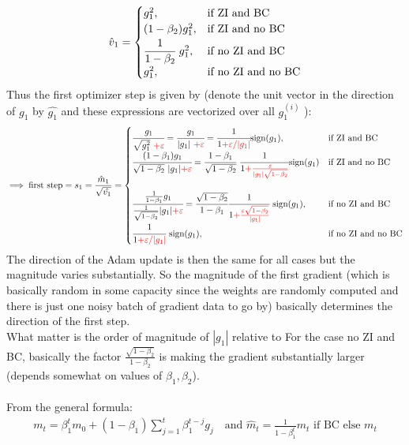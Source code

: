 \documentclass[12pt]{book}
\begin{document}
\[
\hat{v}_1 = \begin{cases}
	g_1^2, \quad &\text{if ZI and BC}\\
	(1-\beta_2)g_1^2, &\text{if ZI and no BC}\\
	\cfrac{1}{1-\beta_2} \ g_1^2, &\text{if no ZI and BC}\\
	g_1^2, &\text{if no ZI and no BC}
\end{cases}
\]
Thus the first optimizer step is given by (denote the unit vector in the direction of $g_1$ by $\hat{g_1}$ and these expressions are vectorized over all $g_1^{(i)}$ ):
\[
\implies \text{first step} = s_1 = \frac{\hat{m}_1}{\sqrt{\hat{v_1}} } = \begin{cases}
	\cfrac{g_1}{\sqrt{g_1^2}  \ \color{red}{+ \varepsilon } } = \cfrac{g_1}{|g_1|  \ \color{red}{+ \varepsilon } } = \cfrac{1}{1 \color{red}{+ \varepsilon / |g_1|}}\text{sign}(g_1), &\text{if ZI and BC}\\
	\cfrac{(1-\beta_1)g_1}{\sqrt{1-\beta_2}\ |g_1| \color{red}{+\varepsilon} } = \cfrac{1-\beta_1}{\sqrt{1-\beta_2} } \ \cfrac{1}{1 \color{red}{+ \frac{\varepsilon }{|g_1|\sqrt{1-\beta_2} }}}\text{sign}(g_1) &\text{if ZI and no BC }\\ 
	\\
	\cfrac{\frac{1}{1-\beta_1}g_1}{\frac{1}{\sqrt{1-\beta_2}} |g_1| \color{red}{+\varepsilon }} =\cfrac{\sqrt{1-\beta_2}}{1-\beta_1} \cfrac{1}{1 \color{red}{+ \frac{\varepsilon \sqrt{1-\beta_2} }{|g_1|}}} \ \text{sign}(g_1), &\text{if no ZI and BC}\\
	\cfrac{1}{1 \color{red}{+ \varepsilon / |g_1|}} \ \text{sign}(g_1), &\text{if no ZI and no BC}\\
\end{cases}
\]
The direction of the Adam update is then the same for all cases but the magnitude varies substantially.
So the magnitude of the first gradient (which is basically random in some capacity since the weights are randomly computed and there is just one noisy batch of gradient data to go by) basically determines the direction of the first step. \\
What matter is the order of magnitude of $|g_1|$ relative to 
For the case no ZI and BC, basically the factor $\frac{\sqrt{1-\beta_2} }{1-\beta_2}$ is making the gradient substantially larger (depends somewhat on values of $\beta_1, \beta_2$). \\
\\
From the general formula:
\begin{align*}
m_t = \beta_1^{t}m_0 + (1-\beta_1)\sum_{j=1}^{t} {\beta_1^{t-j}g_j} \quad \text{and } \hat{m}_t = \frac{1}{1-\beta_1^{t}}m_t \text{ if BC else } m_t
\end{align*}
\end{document}
